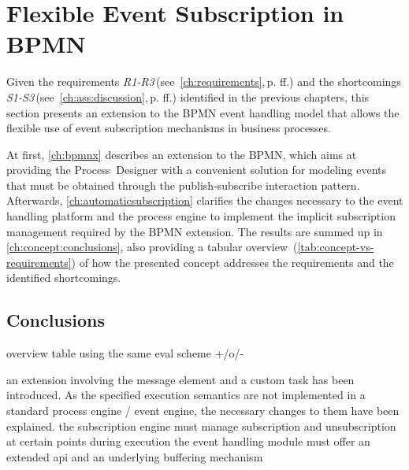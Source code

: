 \chapter{Flexible Event Subscription in BPMN}\label{ch:flexibleeventsubscription}

Given the requirements \textit{R1-R3}\,(see~\autoref{ch:requirements},\,p.\,\pageref{ch:requirements}\,ff.) and the shortcomings \textit{S1-S3}\,(see~\autoref{ch:ass:discussion},\,p.\,\pageref{ch:ass:discussion}\,ff.) identified in the previous chapters, this section presents an extension to the BPMN event handling model that allows the flexible use of event subscription mechanisms in business processes.

At first, \ref{ch:bpmnx} describes an extension to the \acf{BPMN}, which aims at providing the Process~Designer with a convenient solution for modeling events that must be obtained through the publish-subscribe interaction pattern.
Afterwards, \autoref{ch:automaticsubscription} clarifies the changes necessary to the event handling platform and the process engine to implement the implicit subscription management required by the BPMN extension.
The results are summed up in \autoref{ch:concept:conclusions}, also providing a tabular overview~(\autoref{tab:concept-vs-requirements}) of how the presented concept addresses the requirements and the identified shortcomings.


\label{fig:concept-modules}





\section{Conclusions}\label{ch:concept:conclusions}


overview table using the same eval scheme +/o/-

an extension involving the message element and a custom task has been introduced.
As the specified execution semantics are not implemented in a standard process engine / event engine, the necessary changes to them have been explained.
the subscription engine must manage subscription and unsubscription at certain points during execution
the event handling module must offer an extended api and an underlying buffering mechanism


